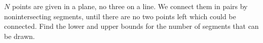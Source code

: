 $N$ points are given in a plane, no three on a line. We connect them in pairs by nonintersecting segments, until there are no two points left which could be connected. Find the lower and upper bounds for the number of segments that can be drawn.
